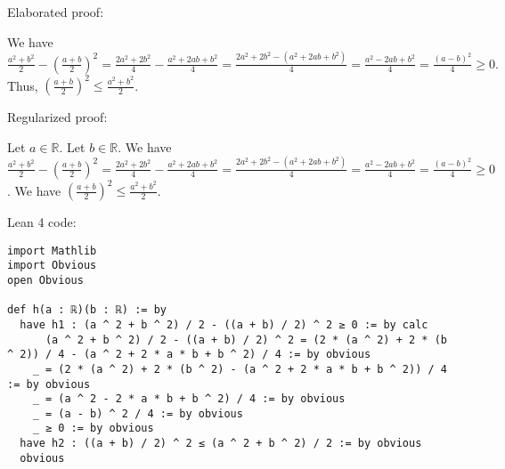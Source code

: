 \documentclass{article}
\begin{document}
Elaborated proof:
\begin{tcolorbox}[colback=green!10, width=\linewidth]
We have
$ \frac{a^2+b^2}{2} - \left(\frac{a+b}{2}\right)^2 = \frac{2a^2+2b^2}{4} - \frac{a^2+2ab+b^2}{4} = \frac{2a^2+2b^2-(a^2+2ab+b^2)}{4} = \frac{a^2-2ab+b^2}{4} = \frac{(a-b)^2}{4} \ge 0. $
Thus, $\left(\frac{a+b}{2}\right)^2 \leq \frac{a^2+b^2}{2}$.
\end{tcolorbox}

Regularized proof:
\begin{tcolorbox}[colback=red!10, width=\linewidth]
Let $a\in\mathbb{R}$.
Let $b\in\mathbb{R}$.
We have $\frac{a^2+b^2}{2} - {\left(\frac{a+b}{2}\right)}^2 = \frac{2a^2+2b^2}{4} - \frac{a^2+2ab+b^2}{4} = \frac{2a^2+2b^2-(a^2+2ab+b^2)}{4} = \frac{a^2-2ab+b^2}{4} = \frac{{(a-b)}^2}{4} \ge 0$.
We have ${\left(\frac{a+b}{2}\right)}^2 \leq \frac{a^2+b^2}{2}$.
\end{tcolorbox}

Lean 4 code:
\begin{tcolorbox}[colback=white!10, width=\linewidth]
\begin{lstlisting}[language=Lean4]
import Mathlib
import Obvious
open Obvious

def h(a : ℝ)(b : ℝ) := by
  have h1 : (a ^ 2 + b ^ 2) / 2 - ((a + b) / 2) ^ 2 ≥ 0 := by calc
      (a ^ 2 + b ^ 2) / 2 - ((a + b) / 2) ^ 2 = (2 * (a ^ 2) + 2 * (b ^ 2)) / 4 - (a ^ 2 + 2 * a * b + b ^ 2) / 4 := by obvious
    _ = (2 * (a ^ 2) + 2 * (b ^ 2) - (a ^ 2 + 2 * a * b + b ^ 2)) / 4 := by obvious
    _ = (a ^ 2 - 2 * a * b + b ^ 2) / 4 := by obvious
    _ = (a - b) ^ 2 / 4 := by obvious
    _ ≥ 0 := by obvious
  have h2 : ((a + b) / 2) ^ 2 ≤ (a ^ 2 + b ^ 2) / 2 := by obvious
  obvious

\end{lstlisting}
\end{tcolorbox}
\end{document}
